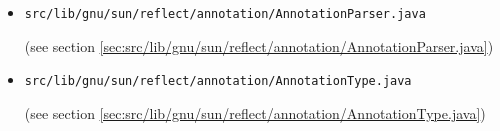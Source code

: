 \documentclass[a4paper, 10pt, titlepage]{scrartcl} %
\begin{document}
\begin{itemize}
 \item \begin{scriptsize}\verb|src|\hspace{0.0pt}\verb|/|\hspace{0.0pt}\verb|lib|\hspace{0.0pt}\verb|/|\hspace{0.0pt}\verb|gnu|\hspace{0.0pt}\verb|/|\hspace{0.0pt}\verb|sun|\hspace{0.0pt}\verb|/|\hspace{0.0pt}\verb|reflect|\hspace{0.0pt}\verb|/|\hspace{0.0pt}\verb|annotation|\hspace{0.0pt}\verb|/|\hspace{0.0pt}\verb|AnnotationParser|\hspace{0.0pt}\verb|.|\hspace{0.0pt}\verb|java|\end{scriptsize} (see section \ref{sec:src/lib/gnu/sun/reflect/annotation/AnnotationParser.java})
 \item \begin{scriptsize}\verb|src|\hspace{0.0pt}\verb|/|\hspace{0.0pt}\verb|lib|\hspace{0.0pt}\verb|/|\hspace{0.0pt}\verb|gnu|\hspace{0.0pt}\verb|/|\hspace{0.0pt}\verb|sun|\hspace{0.0pt}\verb|/|\hspace{0.0pt}\verb|reflect|\hspace{0.0pt}\verb|/|\hspace{0.0pt}\verb|annotation|\hspace{0.0pt}\verb|/|\hspace{0.0pt}\verb|AnnotationType|\hspace{0.0pt}\verb|.|\hspace{0.0pt}\verb|java|\end{scriptsize} (see section \ref{sec:src/lib/gnu/sun/reflect/annotation/AnnotationType.java})

\end{itemize}
\end{document}
